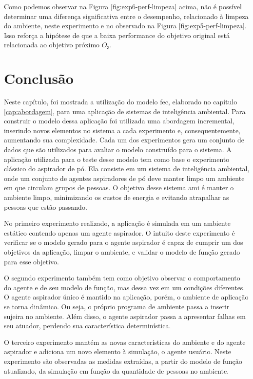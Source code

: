 Como podemos observar na Figura \ref{fig:exp6-perf-limpeza} acima, não é possível determinar uma diferença significativa entre o desempenho, relacionado à limpeza do ambiente, neste experimento e no observado na Figura \ref{fig:exp5-perf-limpeza}. Isso reforça a hipótese de que a baixa performance do objetivo original está relacionada ao objetivo próximo $O_3$.

\section{Conclusão}
\label{sec:conclusao}

Neste capítulo, foi mostrada a utilização do modelo \acrshort{fec}, elaborado no capítulo \ref{cap:abordagem}, para uma aplicação de sistemas de inteligência ambiental. Para construir o modelo dessa aplicação foi utilizada uma abordagem incremental, inserindo novos elementos no sistema a cada experimento e, consequentemente, aumentando sua complexidade. Cada um dos experimentos gera um conjunto de dados que são utilizados para avaliar o modelo construído para o sistema. 
A aplicação utilizada para o teste desse modelo tem como base o experimento clássico do aspirador de pó. Ela consiste em um sistema de inteligência ambiental, onde um conjunto de agentes aspiradores de pó deve manter limpo um ambiente em que circulam grupos de pessoas. O objetivo desse sistema \acrshort{ami} é manter o ambiente limpo, minimizando os custos de energia e evitando atrapalhar as pessoas que estão passando.

No primeiro experimento realizado, a aplicação é simulada em um ambiente estático contendo apenas um agente aspirador. O intuito deste experimento é verificar se o modelo gerado para o agente aspirador é capaz de cumprir um dos objetivos da aplicação, limpar o ambiente, e validar o modelo de função gerado para esse objetivo. 

O segundo experimento também tem como objetivo observar o comportamento do agente e de seu modelo de função, mas dessa vez em um condições diferentes. O agente aspirador único é mantido na aplicação, porém, o ambiente de aplicação se torna dinâmico. Ou seja, o próprio programa de ambiente passa a inserir sujeira no ambiente. Além disso, o agente aspirador passa a apresentar falhas em seu atuador, perdendo sua característica determinística.

O terceiro experimento mantém as novas características do ambiente e do agente aspirador e adiciona um novo elemento à simulação, o agente usuário. Neste experimento são observadas as medidas extraídas, a partir do modelo de função atualizado, da simulação em função da quantidade de pessoas no ambiente.

